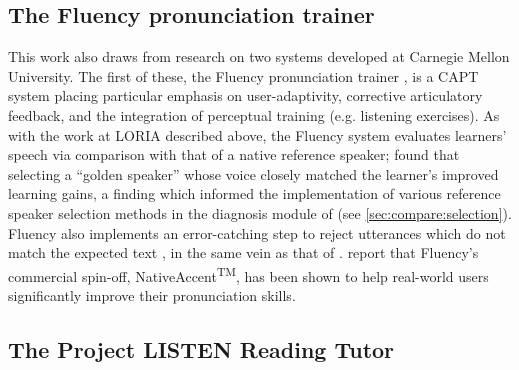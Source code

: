 
	\subsection{The Fluency pronunciation trainer}
	\label{sec:capt:fluency}
	
	This work also draws from research on two systems developed at Carnegie Mellon University.
%
	The first of these, the Fluency pronunciation trainer \citep{Eskenazi1998,Eskenazi2000}, is a CAPT system placing particular emphasis on
user-adaptivity, corrective articulatory feedback, and the integration of perceptual training (e.g. listening exercises). As with the work at LORIA described above, the Fluency system evaluates learners' speech via comparison with that of a native reference speaker; \textcite{Probst2002} found that selecting a ``golden speaker'' whose voice closely matched the learner's improved learning gains, a finding which informed the implementation of various reference speaker selection methods in the diagnosis module of  (see \cref{sec:compare:selection}).
Fluency also implements an error-catching step to reject utterances which do not match the expected text \citep{Eskenazi2000}, in the same vein as that of \textcite{Mesbahi2011,Orosanu2012}. \textcite{Eskenazi2007} report that Fluency's commercial spin-off, NativeAccent\textsuperscript{TM}, has been shown to help real-world users significantly improve their pronunciation skills.
	
	\subsection{The Project LISTEN Reading Tutor}
	\label{sec:capt:listen}
	

